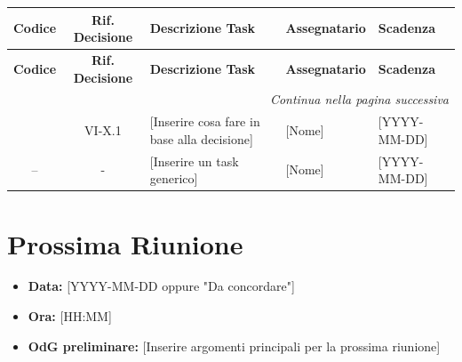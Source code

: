\renewcommand{\arraystretch}{1.3}
\begin{longtable}{c c p{4.5cm} p{3cm} l}
	\toprule
	\textbf{Codice} & \textbf{Rif. Decisione} & \textbf{Descrizione Task} & \textbf{Assegnatario} & \textbf{Scadenza} \\
	\midrule
	\endfirsthead

	\toprule
	\textbf{Codice} & \textbf{Rif. Decisione} & \textbf{Descrizione Task} & \textbf{Assegnatario} & \textbf{Scadenza} \\
	\midrule
	\endhead

	\midrule
	\multicolumn{5}{r}{\textit{Continua nella pagina successiva}} \\
	\midrule
	\endfoot

	\bottomrule
	\endlastfoot

	\ghissue{id} & VI-X.1 & {[Inserire cosa fare in base alla decisione]} & {[Nome]} & {[YYYY-MM-DD]} \\[4pt]
	
	-- & - & {[Inserire un task generico]} & {[Nome]} & {[YYYY-MM-DD]} \\
\end{longtable}

\section{Prossima Riunione}
\begin{itemize}
	\item \textbf{Data:} {[YYYY-MM-DD oppure "Da concordare"]}
	\item \textbf{Ora:} {[HH:MM]}
	\item \textbf{OdG preliminare:} {[Inserire argomenti principali per la prossima riunione]}
\end{itemize}